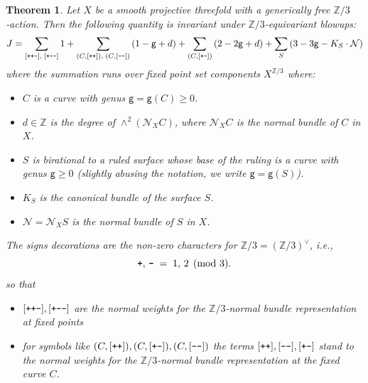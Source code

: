 \documentclass[12pt,a4paper]{amsart}
\newtheorem{theorem}{Theorem}[section]
\theoremstyle{definition}
\theoremstyle{remark}
\newcommand{\lp}{\textup{\texttt{+}}}
\newcommand{\lm}{\textup{\texttt{-}}}
\begin{document}
\begin{theorem}\label{thm:pure-geometry}
Let $X$ be a smooth projective threefold with a generically free $\mathbb Z/3$‐action.  Then the following quantity is invariant under \(\mathbb{Z}/3\)-equivariant blowups:
\begin{equation}
  J = 
    \sum_{[\lp\lp\lm],\; [\lp\lm\lm]} 1
    + 
    \sum_{(C,[\lp\lp]),\; (C,[\lm\lm])} \left(1 - \mathsf{g} + d\right)
    +
    \sum_{(C,[\lp\lm])} \left(2 - 2\mathsf{g} + d\right)
    +
    \sum_{S} \left(3 - 3\mathsf{g} - K_S\cdot \mathcal N\right)
\end{equation}
where the summation runs over fixed point set components $X^{\mathbb Z/3}$ where:
\begin{itemize}
  \item 
   $C$ is a curve with genus \(\mathsf{g}=\mathsf{g}(C) \geq 0\).
  \item 
    \(d \in \mathbb{Z}\) is the degree of \(\wedge^{2}(\mathcal{N}_XC)\), where \(\mathcal{N}_XC\) is the normal bundle of $C$ in $X$.
  \item $S$ is birational to a ruled surface whose base of the ruling is a curve with genus 
    \(\mathsf{g} \geq 0\) (slightly abusing the notation, we write $\mathsf g=\mathsf g(S)$).
  \item 
    \(K_{S}\) is the canonical bundle of the surface \(S\).
  \item 
    \(\mathcal{N}=\mathcal N_X S\) is the normal bundle of \(S\) in $X$.
\end{itemize}
The signs decorations are the non-zero characters for \(\mathbb Z/3 = (\mathbb Z/3)^{\vee}\), i.e.,
\[
  \lp,\,\lm \;=\; 1,\,2 \pmod{3}.
\]
so that
\begin{itemize}
    \item $[\lp\lp\lm], [\lp\lm\lm]$ are the normal weights for the $\mathbb Z/3$-normal bundle representation at fixed points
    \item for symbols like $(C,[\lp\lp]), (C,[\lp\lm]), (C,[\lm\lm])$ the terms $[\lp\lp], [\lm\lm], [\lp\lm]$ stand to the normal weights for the $\mathbb Z/3$-normal bundle representation at the fixed curve $C$.
\end{itemize}
 \end{theorem}
\end{document}
